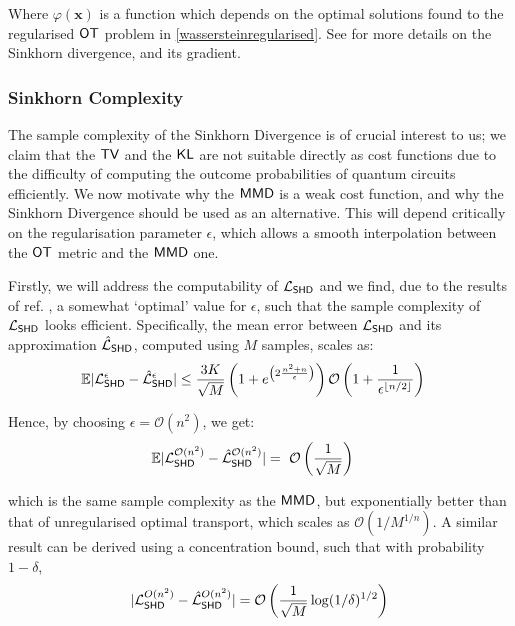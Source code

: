 Where $\varphi(\mathbf{x})$ is a function which depends on the optimal solutions found to the regularised $\operatorname{\textsf{OT}}$ problem in \eqref{wassersteinregularised}. See  for more details on the Sinkhorn divergence, and its gradient.

\subsubsection*{Sinkhorn Complexity}
The sample complexity of the Sinkhorn Divergence is of crucial interest to us; we claim that the $\operatorname{\textsf{TV}}$ and the $\operatorname{\textsf{KL}}$ are not suitable directly as cost functions due to the difficulty of computing the outcome probabilities of quantum circuits efficiently. We now motivate why the $\operatorname{\textsf{MMD}}$ is a weak cost function, and why the Sinkhorn Divergence should be used as an alternative. This will depend critically on the regularisation parameter $\epsilon$, which allows a smooth interpolation between the $\operatorname{\textsf{OT}}$ metric and the $\operatorname{\textsf{MMD}}$ one. 

Firstly, we will address the computability of $\mathcal{L}_{\operatorname{\textsf{SHD}}}$ and we find, due to the results of ref. \cite{genevay_sample_2018}, a somewhat `optimal' value for $\epsilon$, such that the sample complexity of $\mathcal{L}_{\operatorname{\textsf{SHD}}}$ looks efficient. Specifically, the mean error between $\mathcal{L}_{\operatorname{\textsf{SHD}}}$ and its approximation $\hat{\mathcal{L}}_{\operatorname{\textsf{SHD}}}$, computed using $M$ samples, scales as:
\begin{align}
     &\mathbb{E}|\mathcal{L}_{\operatorname{\textsf{SHD}}}^\epsilon - \hat{\mathcal{L}}_{\operatorname{\textsf{SHD}}}^\epsilon| \leq \frac{3K}{\sqrt{M}}\left(1+e^{\left(2\frac{n^2+n}{\epsilon}\right)}\right)\mathcal{O}\left(1+\frac{1}{\epsilon^{\lfloor n/2\rfloor}}\right)
\end{align}

\noindent Hence, by choosing $\epsilon = \mathcal{O}(n^{2})$, we get:
\begin{align}
     &\mathbb{E}|\mathcal{L}_{\operatorname{\textsf{SHD}}}^{\mathcal{O}(n^{2})} - \hat{\mathcal{L}}_{\operatorname{\textsf{SHD}}}^{ \mathcal{O}(n^{2})}| =~ \mathcal{O}\left(\frac{1}{\sqrt{M}}\right) \label{sinkhorn_expectation_sample_chosen_MAIN}
\end{align}

\noindent which is the same sample complexity as the $\operatorname{\textsf{MMD}}$\cite{sriperumbudur_integral_2009}, but exponentially better than that of unregularised optimal transport, which scales as $\mathcal{O}\left(1/{M}^{1/n}\right)$\cite{dudley_speed_1969}. A similar result can be derived using a concentration bound\cite{genevay_sample_2018}, such that with probability $1-\delta$, 
\begin{align}
    |\mathcal{L}_{\operatorname{\textsf{SHD}}}^{O(n^{2})}  - \hat{\mathcal{L}}_{\operatorname{\textsf{SHD}}}^{O(n^{2})} | 
    = \mathcal{O}\left(\frac{1}{\sqrt{M}}\log(1/\delta)^{1/2}\right) \label{sinkhornborn_samplecomplexity_choosed_MAIN}
\end{align}

